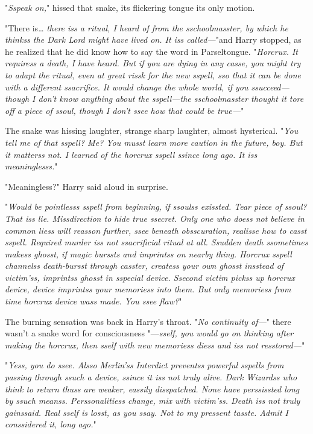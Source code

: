 "\emph{Sspeak on,}" hissed that snake, its flickering tongue its only motion.

"There is{\ldots} \emph{there iss a ritual, I heard of from the sschoolmasster, 
by which he thinkss the Dark Lord might have lived on. It iss called---}"and 
Harry stopped, as he realized that he did know how to say the word in 
Parseltongue. "\emph{Horcrux. It requiress a death, I have heard. But if you 
are dying in any casse, you might try to adapt the ritual, even at great rissk 
for the new sspell, sso that it can be done with a different ssacrifice. It 
would change the whole world, if you ssucceed---though I don't know anything 
about the sspell---the sschoolmasster thought it tore off a piece of ssoul, 
though I don't ssee how that could be true---}"

The snake was hissing laughter, strange sharp laughter, almost hysterical. 
"\emph{You tell me of that sspell? Me? You musst learn more caution in the 
future, boy. But it matterss not. I learned of the horcrux sspell ssince long 
ago. It iss meaninglesss.}"

"Meaningless?" Harry said aloud in surprise.

"\emph{Would be pointlesss sspell from beginning, if ssoulss exissted. Tear 
piece of ssoul? That iss lie. Missdirection to hide true ssecret. Only one who 
doess not believe in common liess will reasson further, ssee beneath 
obsscuration, realisse how to casst sspell. Required murder iss not 
ssacrificial ritual at all. Ssudden death ssometimes makess ghosst, if magic 
burssts and imprintss on nearby thing. Horcrux sspell channelss death-bursst 
through casster, createss your own ghosst insstead of victim'ss, imprintss 
ghosst in sspecial device. Ssecond victim pickss up horcrux device, device 
imprintss your memoriess into them. But only memoriess from time horcrux device 
wass made. You ssee flaw?}"

The burning sensation was back in Harry's throat. "\emph{No continuity of---}" 
there wasn't a snake word for consciousness "---\emph{sself, you would go on 
thinking after making the horcrux, then sself with new memoriess diess and iss 
not resstored---}"

"\emph{Yess, you do ssee. Alsso Merlin'ss Interdict preventss powerful sspells 
from passing through ssuch a device, ssince it iss not truly alive. Dark 
Wizardss who think to return thuss are weaker, eassily disspatched. None have 
perssissted long by ssuch meanss. Perssonalitiess change, mix with victim'ss. 
Death iss not truly gainssaid. Real sself is losst, as you ssay. Not to my 
pressent tasste. Admit I conssidered it, long ago.}"

